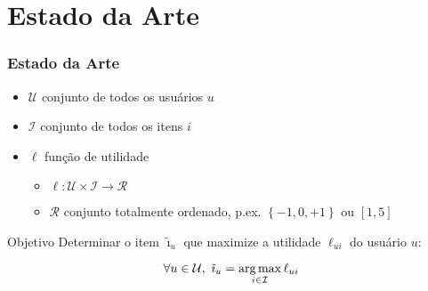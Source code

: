 \section[Estado da Arte]{Estado da Arte}
\begin{frame}
\frametitle{Estado da Arte}
\begin{itemize}
	\item $\mathcal{U}$ conjunto de todos os usuários $u$
	\item $\mathcal{I}$ conjunto de todos os itens $i$
	\item $\ell$ função de utilidade 
	\begin{itemize}
		\item $\ell: \mathcal{U} \times \mathcal{I} \rightarrow \mathcal{R}$
		\item $\mathcal{R}$ conjunto totalmente ordenado, p.ex. $\left\{-1, 0, +1\right\}$ ou $[1, 5]$
	\end{itemize}
\end{itemize}


\begin{block}{Objetivo}
Determinar o item $\tilde{\imath}_u$ que maximize a utilidade $\ell_{ui}$ do usuário $u$:
\end{block}

\begin{equation} 
\label{eq:utilidade}
\forall u \in \mathcal{U}, ~ \tilde{\imath}_u = \operatorname*{arg\,max}_{i \in \mathcal{I}}{\ell_{ui}}
\end{equation}
\end{frame}
